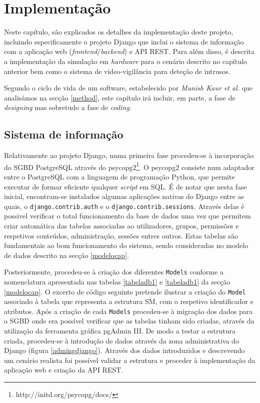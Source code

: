 



\chapter{Implementação}
\label{implementacao}





Neste capítulo, são explicados os detalhes da implementação deste projeto, incluindo especificamente o projeto Django que inclui o sistema de informação com a aplicação web (\textit{frontend}/\textit{backend}) e API REST. Para além disso, é descrita a implementação da simulação em \textit{hardware} para o cenário descrito no capítulo anterior bem como o sistema de video-vigilância para deteção de intrusos. 

Segundo o ciclo de vida de um software, estabelecido por \textit{Munish Kaur et al.}\cite{Saini2014} que analisámos na secção \ref{method}, este capítulo irá incluir, em parte, a fase de \textit{designing} mas sobretudo a fase de \textit{coding}. 





\section{Sistema de informação}


Relativamente ao projeto Django, numa primeira fase procedeu-se à incorporação do \ac{SGBD} PostgreSQL através do psycopg2\footnote{http://initd.org/psycopg/docs/}. O psycopg2 consiste num adaptador entre o PostgreSQL com a linguagem de programação Python, que permite executar de formar eficiente qualquer \textit{script} em \ac{SQL}. É de notar que nesta fase inicial, encontram-se instalados algumas aplicações nativas do Django entre as quais, o  \texttt{django.contrib.auth} e  o \texttt{django.contrib.sessions}. Através delas é possivel verificar o total funcionamento da base de dados uma vez que permitem criar automática das tabelas associadas ao utilizadores, grupos, permissões e respetivos conteúdos, administração, sessões entres outros. Estas tabelas são fundamentais ao bom funcionamento do sistema, sendo consideradas no modelo de dados descrito na secção \ref{modelocap}. 


Posteriormente, procedeu-se à criação dos diferentes \texttt{Models} conforme a nomenclatura apresentada nas tabelas \ref{tabeladb1} e \ref{tabeladb1} da secção \ref{modelocap}. O excerto de código seguinte pretende ilustrar a criação do \texttt{Model} associado à tabela que representa a estrutura \acl{SM}, com o respetivo identificador e atributos.  Após a criação de cada \texttt{Models} procedeu-se à migração dos dados para o \ac{SGBD} onde era possível verificar que as tabelas tinham sido criadas, através da utilização da ferramenta gráfica pgAdmin III. De modo a testar a estrutura criada, procedeu-se à introdução de dados através da zona administrativa do Django (figura \ref{admingdjango}). Através dos dados introduzidos e descrevendo um cenário realista foi possível validar a estrutura e proceder à implementação da aplicação web e criação da \ac{API} \ac{REST}. 




